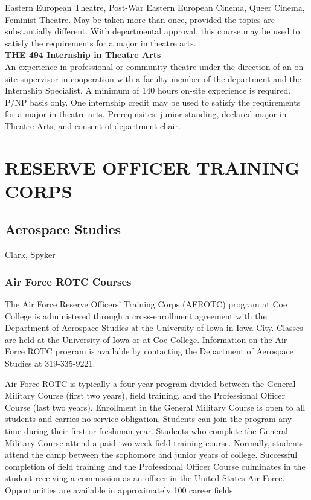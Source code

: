 \documentclass[
  letterpaper,
]{scrbook}
\begin{document}
Eastern European Theatre, Post-War Eastern European Cinema, Queer
Cinema, Feminist Theatre. May be taken more than once, provided the
topics are substantially different. With departmental approval, this
course may be used to satisfy the requirements for a major in theatre
arts.\\
\textbf{THE 494 Internship in Theatre Arts}\\
An experience in professional or community theatre under the direction
of an on-site supervisor in cooperation with a faculty member of the
department and the Internship Specialist. A minimum of 140 hours on-site
experience is required. P/NP basis only. One internship credit may be
used to satisfy the requirements for a major in theatre arts.
Prerequisites: junior standing, declared major in Theatre Arts, and
consent of department chair.

\chapter{RESERVE OFFICER TRAINING
CORPS}\label{reserve-officer-training-corps}

\section{Aerospace Studies}\label{aerospace-studies}

Clark, Spyker

\subsection{Air Force ROTC Courses}\label{air-force-rotc-courses}

The Air Force Reserve Officers' Training Corps (AFROTC) program at Coe
College is administered through a cross-enrollment agreement with the
Department of Aerospace Studies at the University of Iowa in Iowa City.
Classes are held at the University of Iowa or at Coe College.
Information on the Air Force ROTC program is available by contacting the
Department of Aerospace Studies at 319-335-9221.

Air Force ROTC is typically a four-year program divided between the
General Military Course (first two years), field training, and the
Professional Officer Course (last two years). Enrollment in the General
Military Course is open to all students and carries no service
obligation. Students can join the program any time during their first or
freshman year. Students who complete the General Military Course attend
a paid two-week field training course. Normally, students attend the
camp between the sophomore and junior years of college. Successful
completion of field training and the Professional Officer Course
culminates in the student receiving a commission as an officer in the
United States Air Force. Opportunities are available in approximately
100 career fields.
\end{document}
